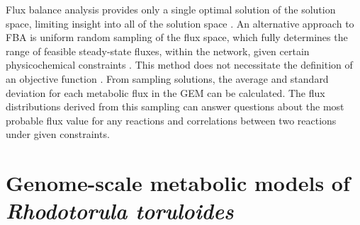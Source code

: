 Flux balance analysis provides only a single optimal solution of the solution space, limiting insight into all of the solution space \cite{Becker2007}. 
An alternative approach to FBA is uniform random sampling of the flux space, which fully determines the range of feasible steady-state fluxes, within the network, given certain physicochemical constraints \cite{Price2004a}.   
This method does not necessitate the definition of an objective function \cite{Bordel2010}. From sampling solutions, the average and standard deviation for each metabolic flux in the GEM can be calculated.
The flux distributions derived from this sampling can answer questions about the most probable flux value for any reactions and correlations between two reactions under given constraints. \cite{Becker2007}




\section{Genome-scale metabolic models of \textit{Rhodotorula toruloides}} 

